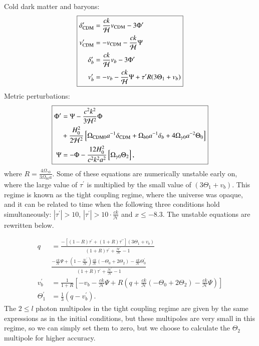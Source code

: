 \documentclass{aa}
\begin{document}
Cold dark matter and baryons:
$$
\boxed{
\begin{aligned}
\delta_{\rm CDM}^\prime &= \frac{ck}{\mathcal{H}} v_{\rm CDM} - 3\Phi^\prime \\
v_{\rm CDM}^\prime &= -v_{\rm CDM} -\frac{ck}{\mathcal{H}} \Psi \\
\delta_b^\prime &= \frac{ck}{\mathcal{H}}v_b -3\Phi^\prime \\
v_b^\prime &= -v_b - \frac{ck}{\mathcal{H}}\Psi + \tau^\prime R(3\Theta_1 + v_b) \\
\end{aligned}
}
$$
Metric perturbations:
$$
\boxed{
\begin{aligned}
\Phi^\prime &= \Psi - \frac{c^2k^2}{3\mathcal{H}^2} \Phi\\
&+ \frac{H_0^2}{2\mathcal{H}^2}
\left[\Omega_{\rm CDM 0} a^{-1} \delta_{\rm CDM} + \Omega_{b 0} a^{-1} \delta_b + 4\Omega_{\gamma 0}
a^{-2}\Theta_0\right] \\
\Psi &= -\Phi - \frac{12H_0^2}{c^2k^2a^2}\left[\Omega_{\gamma 0}\Theta_2\right], \\
\end{aligned}
}
$$
where $R = \frac{4\Omega_{\gamma 0}}{3\Omega_{b 0} a}$. Some of these equations are numerically unstable early on, where the large value of $\tau^\prime$ is multiplied by the small value of $(3\Theta_1+v_b)$.  
This regime is known as the tight coupling regime, where the universe was opaque, and it can be related to time when the following three conditions hold simultaneously: $|\tau^\prime|>10$, $|\tau^\prime|>10\cdot \frac{ck}{\mathcal{H}}$ and
$x\leq -8.3$. The unstable equations are rewritten below.

$$
\boxed{
\begin{aligned}
q &= \frac{-[(1-R)\tau^\prime + (1+R)\tau^{\prime\prime}](3\Theta_1+v_b)}{(1+R)\tau^\prime + \frac{\mathcal{H}^\prime}{\mathcal{H}} -1}\\
  &\frac{-\frac{ck}{\mathcal{H}}\Psi + (1-\frac{\mathcal{H}^\prime}{\mathcal{H}})\frac{ck}{\mathcal{H}}(-\Theta_0 +
2\Theta_2) - \frac{ck}{\mathcal{H}}\Theta_0^\prime}{(1+R)\tau^\prime + \frac{\mathcal{H}^\prime}{\mathcal{H}} -1}\\
v_b^\prime &= \frac{1}{1+R} \left[-v_b - \frac{ck}{\mathcal{H}}\Psi + R(q +
\frac{ck}{\mathcal{H}}(-\Theta_0 + 2\Theta_2) - \frac{ck}{\mathcal{H}}\Psi)\right]\\
\Theta^\prime_1 &= \frac{1}{3} (q - v_b^\prime).
\end{aligned}
}
$$
The $2 \leq l$ photon multipoles in the tight coupling regime are given by the same expressions as in the initial conditions, but these multipoles are very small in this regime,
so we can simply set them to zero, but we choose to calculate the $\Theta_2$ multipole for higher accuracy.\\
\\
\end{document}
